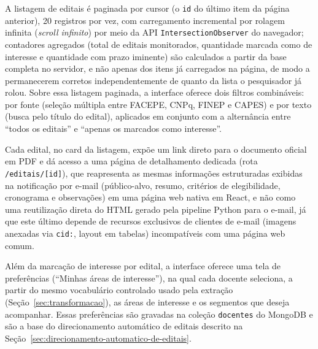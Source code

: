 \documentclass[12pt]{article}
\begin{document}
  A listagem de editais é paginada por cursor (o \texttt{id} do último item da página anterior), 20 registros por vez, com carregamento incremental por rolagem infinita (\emph{scroll infinito}) por meio da API \texttt{IntersectionObserver} do navegador; contadores agregados (total de editais monitorados, quantidade marcada como de interesse e quantidade com prazo iminente) são calculados a partir da base completa no servidor, e não apenas dos itens já carregados na página, de modo a permanecerem corretos independentemente de quanto da lista o pesquisador já rolou. Sobre essa listagem paginada, a interface oferece dois filtros combináveis: por fonte (seleção múltipla entre FACEPE, CNPq, FINEP e CAPES) e por texto (busca pelo título do edital), aplicados em conjunto com a alternância entre ``todos os editais'' e ``apenas os marcados como interesse''.

  Cada edital, no card da listagem, expõe um link direto para o documento oficial em PDF e dá acesso a uma página de detalhamento dedicada (rota \texttt{/editais/[id]}), que reapresenta as mesmas informações estruturadas exibidas na notificação por e-mail (público-alvo, resumo, critérios de elegibilidade, cronograma e observações) em uma página web nativa em React, e não como uma reutilização direta do HTML gerado pela pipeline Python para o e-mail, já que este último depende de recursos exclusivos de clientes de e-mail (imagens anexadas via \texttt{cid:}, layout em tabelas) incompatíveis com uma página web comum.

  Além da marcação de interesse por edital, a interface oferece uma tela de preferências (``Minhas áreas de interesse''), na qual cada docente seleciona, a partir do mesmo vocabulário controlado usado pela extração (Seção~\ref{sec:transformacao}), as áreas de interesse e os segmentos que deseja acompanhar. Essas preferências são gravadas na coleção \texttt{docentes} do MongoDB e são a base do direcionamento automático de editais descrito na Seção~\ref{sec:direcionamento-automatico-de-editais}.
\end{document}
